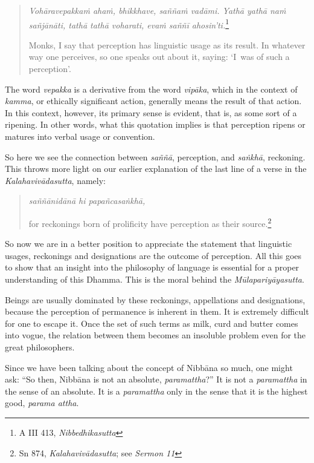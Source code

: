 \begin{quote}
\emph{Vohāravepakkaṁ ahaṁ, bhikkhave, saññaṁ vadāmi. Yathā yathā naṁ sañjānāti, tathā tathā voharati, evaṁ saññī ahosin'ti.}\footnote{A III 413, \emph{Nibbedhikasutta}}

Monks, I say that perception has linguistic usage as its result. In whatever way one perceives, so one speaks out about it, saying: `I~was of such a perception'.
\end{quote}

The word \emph{vepakka} is a derivative from the word \emph{vipāka}, which in the context of \emph{kamma}, or ethically significant action, generally means the result of that action. In this context, however, its primary sense is evident, that is, as some sort of a ripening. In other words, what this quotation implies is that perception ripens or matures into verbal usage or convention.

So here we see the connection between \emph{saññā}, perception, and \emph{saṅkhā}, reckoning. This throws more light on our earlier explanation of the last line of a verse in the \emph{Kalahavivādasutta}, namely:

\begin{quote}
\emph{saññānidānā hi papañcasaṅkhā,}

for reckonings born of prolificity have perception as their source.\footnote{Sn 874, \emph{Kalahavivādasutta}; see \emph{Sermon 11}}
\end{quote}

So now we are in a better position to appreciate the statement that linguistic usages, reckonings and designations are the outcome of perception. All this goes to show that an insight into the philosophy of language is essential for a proper understanding of this Dhamma. This is the moral behind the \emph{Mūlapariyāyasutta}.

Beings are usually dominated by these reckonings, appellations and designations, because the perception of permanence is inherent in them. It is extremely difficult for one to escape it. Once the set of such terms as milk, curd and butter comes into vogue, the relation between them becomes an insoluble problem even for the great philosophers.

Since we have been talking about the concept of Nibbāna so much, one might ask: ``So then, Nibbāna is not an absolute, \emph{paramattha}?'' It is not a \emph{paramattha} in the sense of an absolute. It is a \emph{paramattha} only in the sense that it is the highest good, \emph{parama attha}.

